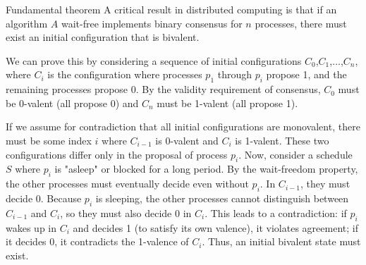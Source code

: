 \begin{Thm}{Fundamental theorem}{}
A critical result in distributed computing is that if an algorithm $A$ wait-free implements binary consensus for $n$ processes, there must exist an initial configuration that is bivalent.
\begin{demonstration}
We can prove this by considering a sequence of initial configurations $C_0$,$C_1$,$\ldots$,$C_n$, where $C_i$ is the configuration where processes $p_1$ through $p_i$ propose 1, and the remaining processes propose 0. By the validity requirement of consensus, $C_0$ must be 0-valent (all propose 0) and $C_n$ must be 1-valent (all propose 1).

If we assume for contradiction that all initial configurations are monovalent, there must be some index $i$ where $C_{i-1}$ is 0-valent and $C_i$ is 1-valent. These two configurations differ only in the proposal of process $p_i$. Now, consider a schedule $S$ where $p_i$ is "asleep" or blocked for a long period. By the wait-freedom property, the other processes must eventually decide even without $p_i$. In $C_{i-1}$, they must decide 0. Because $p_i$ is sleeping, the other processes cannot distinguish between $C_{i-1}$ and $C_i$, so they must also decide 0 in $C_i$. This leads to a contradiction: if $p_i$ wakes up in $C_i$ and decides 1 (to satisfy its own valence), it violates agreement; if it decides 0, it contradicts the 1-valence of $C_i$. Thus, an initial bivalent state must exist.
\end{demonstration}
\end{Thm}

